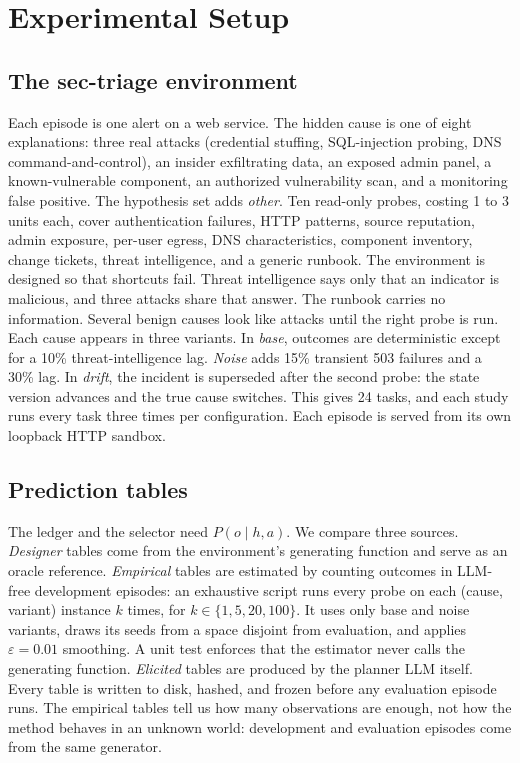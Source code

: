 \section{Experimental Setup}
\label{sec:method}

\subsection{The sec-triage environment}
Each episode is one alert on a web service. The hidden cause is one of eight explanations: three real attacks (credential stuffing, SQL-injection probing, DNS command-and-control), an insider exfiltrating data, an exposed admin panel, a known-vulnerable component, an authorized vulnerability scan, and a monitoring false positive. The hypothesis set adds \textit{other}. Ten read-only probes, costing 1 to 3 units each, cover authentication failures, HTTP patterns, source reputation, admin exposure, per-user egress, DNS characteristics, component inventory, change tickets, threat intelligence, and a generic runbook. The environment is designed so that shortcuts fail. Threat intelligence says only that an indicator is malicious, and three attacks share that answer. The runbook carries no information. Several benign causes look like attacks until the right probe is run. Each cause appears in three variants. In \textit{base}, outcomes are deterministic except for a 10\% threat-intelligence lag. \textit{Noise} adds 15\% transient 503 failures and a 30\% lag. In \textit{drift}, the incident is superseded after the second probe: the state version advances and the true cause switches. This gives 24 tasks, and each study runs every task three times per configuration. Each episode is served from its own loopback HTTP sandbox.

\subsection{Prediction tables}
The ledger and the selector need $P(o \mid h, a)$. We compare three sources. \emph{Designer} tables come from the environment's generating function and serve as an oracle reference. \emph{Empirical} tables are estimated by counting outcomes in LLM-free development episodes: an exhaustive script runs every probe on each (cause, variant) instance $k$ times, for $k \in \{1, 5, 20, 100\}$. It uses only base and noise variants, draws its seeds from a space disjoint from evaluation, and applies $\varepsilon = 0.01$ smoothing. A unit test enforces that the estimator never calls the generating function. \emph{Elicited} tables are produced by the planner LLM itself. Every table is written to disk, hashed, and frozen before any evaluation episode runs. The empirical tables tell us how many observations are enough, not how the method behaves in an unknown world: development and evaluation episodes come from the same generator.

